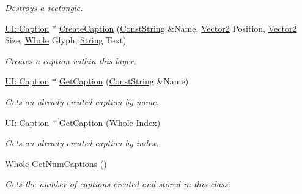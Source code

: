 \begin{DoxyCompactItemize}
\begin{DoxyCompactList}\small\item\em Destroys a rectangle. \item\end{DoxyCompactList}\item 
\hyperlink{classphys_1_1UI_1_1Caption}{UI::Caption} $\ast$ \hyperlink{classphys_1_1UILayer_a859fb1ad868dec6c1f92987780781a27}{CreateCaption} (\hyperlink{namespacephys_a5ce5049f8b4bf88d6413c47b504ebb31}{ConstString} \&Name, \hyperlink{classphys_1_1Vector2}{Vector2} Position, \hyperlink{classphys_1_1Vector2}{Vector2} Size, \hyperlink{namespacephys_a460f6bc24c8dd347b05e0366ae34f34a}{Whole} Glyph, \hyperlink{namespacephys_aa03900411993de7fbfec4789bc1d392e}{String} Text)
\begin{DoxyCompactList}\small\item\em Creates a caption within this layer. \item\end{DoxyCompactList}\item 
\hyperlink{classphys_1_1UI_1_1Caption}{UI::Caption} $\ast$ \hyperlink{classphys_1_1UILayer_a2f9a2b50de833f5c57d4410fd1ea6eba}{GetCaption} (\hyperlink{namespacephys_a5ce5049f8b4bf88d6413c47b504ebb31}{ConstString} \&Name)
\begin{DoxyCompactList}\small\item\em Gets an already created caption by name. \item\end{DoxyCompactList}\item 
\hyperlink{classphys_1_1UI_1_1Caption}{UI::Caption} $\ast$ \hyperlink{classphys_1_1UILayer_a0f087439496766594aa3f94a8ef2ec2b}{GetCaption} (\hyperlink{namespacephys_a460f6bc24c8dd347b05e0366ae34f34a}{Whole} Index)
\begin{DoxyCompactList}\small\item\em Gets an already created caption by index. \item\end{DoxyCompactList}\item 
\hyperlink{namespacephys_a460f6bc24c8dd347b05e0366ae34f34a}{Whole} \hyperlink{classphys_1_1UILayer_a76b9f48b8b40c4e933dc1f3cf624ffbc}{GetNumCaptions} ()
\begin{DoxyCompactList}\small\item\em Gets the number of captions created and stored in this class. \item\end{DoxyCompactList}\item 

\end{DoxyCompactItemize}

